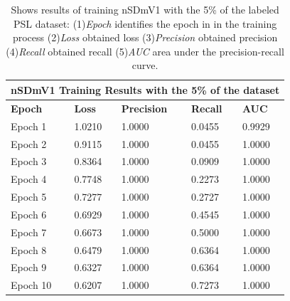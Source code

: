 \documentclass[twocolumn,conference]{article}
\begin{document}
\begin{table}
\captionsetup{font=footnotesize}
\centering
\begin{tabular}{ p{2.8cm} p{2.8cm} p{2.8cm} p{2.8cm} p{2.8cm} }
\toprule
\multicolumn{5}{c}{\textbf{nSDmV1 Training Results with the 5\% of the dataset}} \\
\hline
\hline
\textbf{Epoch}&	\textbf{Loss}	&\textbf{Precision}	&\textbf{Recall}	&\textbf{AUC} \\
\hline
\midrule
Epoch 1&	1.0210&	1.0000&	0.0455&	0.9929\\
Epoch 2&	0.9115&	1.0000&	0.0455&	1.0000\\
Epoch 3&	0.8364&	1.0000&	0.0909&	1.0000\\
Epoch 4&	0.7748&	1.0000&	0.2273&	1.0000\\
Epoch 5&	0.7277&	1.0000&	0.2727&	1.0000\\
Epoch 6&	0.6929&	1.0000&	0.4545&	1.0000\\
Epoch 7&	0.6673&	1.0000&	0.5000&	1.0000\\
Epoch 8&	0.6479&	1.0000&	0.6364&	1.0000\\
Epoch 9&	0.6327&	1.0000&	0.6364&	1.0000\\
Epoch 10&	0.6207&	1.0000&	0.7273&	1.0000\\
\bottomrule
\end{tabular}
\caption{Shows results of training nSDmV1 with the 5\% of the labeled PSL dataset: (1)\textit{Epoch} identifies the epoch in in the training process (2)\textit{Loss} obtained loss (3)\textit{Precision} obtained precision (4)\textit{Recall} obtained recall (5)\textit{AUC} area under the precision-recall curve.}
\label{tab:nSDmV1-detection-results-5-percent}
\end{table}
\end{document}
